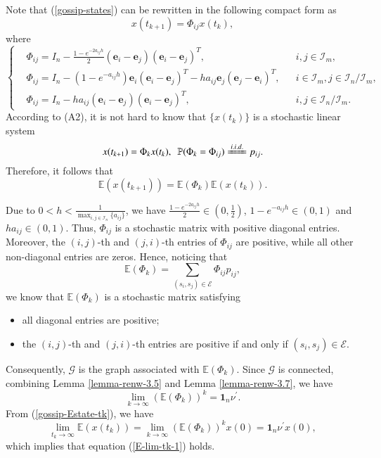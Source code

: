 \documentclass[12pt,draftcls,onecolumn]{IEEEtran}
\begin{document}
Note that (\ref{gossip-states}) can be rewritten in the following compact form as
$$x(t_{k+1})=\Phi_{ij}x(t_k),$$
where
\begin{equation}\label{phi-ij}
\left\{
\begin{aligned}
&\Phi_{ij}=I_n-\frac{1-e^{-2a_{ij}h}}{2}(\mathbf{e}_i-\mathbf{e}_j)(\mathbf{e}_i-\mathbf{e}_j)^T,&&i,j\in \mathcal{I}_m,\\
&\Phi_{ij}=I_n-(1-e^{-a_{ij}h})\mathbf{e}_i(\mathbf{e}_i-\mathbf{e}_j)^T
-ha_{ij}\mathbf{e}_j(\mathbf{e}_j-\mathbf{e}_i)^T,&&i\in \mathcal{I}_m,j\in \mathcal{I}_{n}/\mathcal{I}_{m},\\
&\Phi_{ij}=I_n-ha_{ij}(\mathbf{e}_i-\mathbf{e}_j)(\mathbf{e}_i-\mathbf{e}_j)^T,&&i,j\in \mathcal{I}_{n}/\mathcal{I}_{m}.
\end{aligned}
\right.
\end{equation}
According to (A2), it is not hard to know that $\{x({t_k})\}$ is a stochastic
linear system
\[x(t_{k+1})=\Phi_{k}x(t_k), ~~\mathbb{P}(\Phi_{k} =\Phi_{ij})\xlongequal [ ]{i.i.d.}p_{ij}.
\]Therefore, it follows that
\begin{equation}\label{gossip-Estate-tk}
\mathbb{E}(x(t_{k+1}))=\mathbb{E}(\Phi_{k})\mathbb{E}(x(t_k)).
\end{equation}

Due to $0<h<\frac{1}{\max_{i,j\in \mathcal{I}_n}\{a_{ij}\}}$, we have $\frac{1-e^{-2a_{ij}h}}{2}\in (0,\frac{1}{2})$, $1-e^{-a_{ij}h}\in (0,1)$ and $ha_{ij}\in (0,1)$. Thus, $\Phi_{ij}$ is a stochastic matrix with positive diagonal entries. Moreover, the $(i,j)$-th and $(j,i)$-th entries of $\Phi_{ij}$ are positive, while all other non-diagonal entries are zeros. Hence, noticing that
$$\mathbb{E}(\Phi_{k})=\sum_{(s_i,s_j)\in \mathscr{E}}\Phi_{ij}p_{ij},$$
we know that $\mathbb{E}(\Phi_{k})$ is a stochastic matrix satisfying
\begin{itemize}
  \item all diagonal entries are positive;
  \item the $(i,j)$-th and $(j,i)$-th entries are positive if and only if $(s_i,s_j)\in \mathscr{E}$.
\end{itemize}

Consequently, $\mathscr{G}$ is the graph associated with $\mathbb{E}(\Phi_{k})$. Since $\mathscr{G}$ is connected, combining Lemma \ref{lemma-renw-3.5} and Lemma \ref{lemma-renw-3.7}, we have
$$\lim_{k\rightarrow\infty}(\mathbb{E}(\Phi_{k}))^k=\mathbf{1}_n\nu^{'}.$$
From (\ref{gossip-Estate-tk}), we have
$$
\lim_{t_k\rightarrow\infty}\mathbb{E}(x(t_{k}))
=\lim_{k\rightarrow\infty}(\mathbb{E}(\Phi_{k}))^kx(0)=\mathbf{1}_n\nu^{'}x(0),
$$
which implies that equation (\ref{E-lim-tk-1}) holds.
\end{document}
